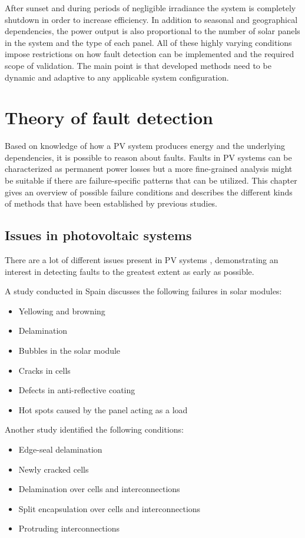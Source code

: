 After sunset and during periods of negligible irradiance the system is completely shutdown in order to increase efficiency.
In addition to seasonal and geographical dependencies, the power output is also proportional to the number of solar panels in the system and the type of each panel.
All of these highly varying conditions impose restrictions on how fault detection can be implemented and the required scope of validation.
The main point is that developed methods need to be dynamic and adaptive to any applicable system configuration.

\chapter{Theory of fault detection}
Based on knowledge of how a PV system produces energy and the underlying dependencies,
it is possible to reason about faults.
Faults in PV systems can be characterized as permanent power losses but a more fine-grained analysis might be suitable if there are failure-specific patterns that can be utilized.
This chapter gives an overview of possible failure conditions and describes the different kinds of methods that have been established by previous studies.

\section{Issues in photovoltaic systems}
There are a lot of different issues present in PV systems \cite{Baltus1997,King2002,Petrone2008}, demonstrating an interest in detecting faults to the greatest extent as early as possible.

A study conducted in Spain\cite{Munoz2011} discusses the following failures in solar modules:
\begin{itemize}
\item Yellowing and browning
\item Delamination
\item Bubbles in the solar module
\item Cracks in cells
\item Defects in anti-reflective coating
\item Hot spots caused by the panel acting as a load
\end{itemize}

Another study\cite{Forman1982} identified the following conditions:
\begin{itemize}
\item Edge-seal delamination
\item Newly cracked cells
\item Delamination over cells and interconnections
\item Split encapsulation over cells and interconnections
\item Protruding interconnections
\end{itemize}

